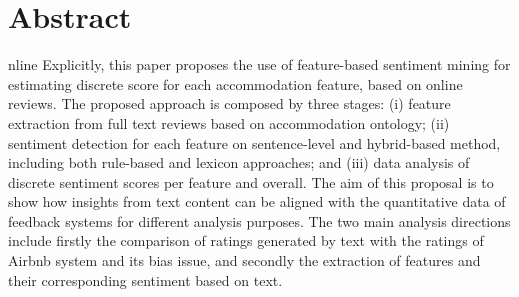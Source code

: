 %

\let\cleardoublepage\clearpage
\chapter{Abstract}
\begin{SingleSpace}

nline {\color{red}{reviews are an important source for both customers, to obtaining information before making purchase decisions, and businesses to improve the quality of their services. Opinion mining is an active field of research that makes use of Natural Language Processing (NLP) techniques for mining the huge amount of online text reviews. This paper aims to enhance the focus on customers by analyzing their opinions and aligning the results with the quantitative feedback received. The setting of this research is the dataset of Airbnb reviews, a giant online marketplace for vacation rentals. }} Explicitly, this paper proposes the use of feature-based sentiment mining for estimating discrete score for each accommodation feature, based on online reviews. The proposed approach is composed by three stages: (i) feature extraction from full text reviews based on accommodation ontology; (ii) sentiment detection for each feature on sentence-level and hybrid-based method, including both rule-based and lexicon approaches; and (iii) data analysis of discrete sentiment scores per feature and overall. The aim of this proposal is to show how insights from text content can be aligned with the quantitative data of feedback systems for different analysis purposes. The two main analysis directions include firstly the comparison of ratings generated by text with the ratings of Airbnb system and its bias issue, and secondly the extraction of features and their corresponding sentiment based on text. 
\end{SingleSpace}
\clearpage